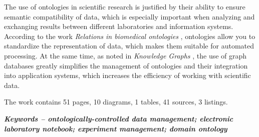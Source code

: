 The use of ontologies in scientific research is justified by their ability to ensure semantic compatibility of data, which is especially important when analyzing and exchanging results between different laboratories and information systems. According to the work \textit{Relations in biomedical ontologies} \cite{ontology:base1}, ontologies allow you to standardize the representation of data, which makes them suitable for automated processing. At the same time, as noted in \textit{Knowledge Graphs} \cite{ontology:base2}, the use of graph databases greatly simplifies the management of ontologies and their integration into application systems, which increases the efficiency of working with scientific data.

The work contains 51 pages, 10 diagrams, 1 tables, 41 sources, 3 listings.

\textit{\textbf{Keywords -- ontologically-controlled data management; electronic laboratory notebook; experiment management; domain ontology}}
